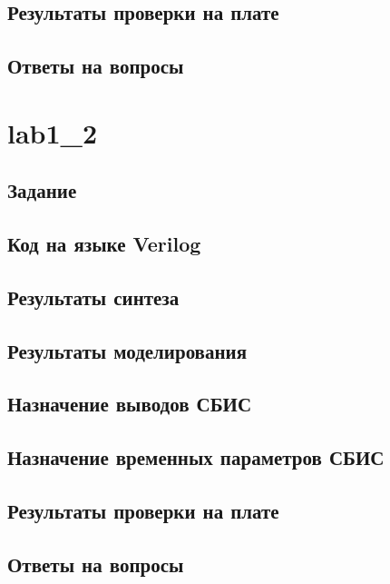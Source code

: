 \subsection{Результаты проверки на плате}

\subsection{Ответы на вопросы}

\section{lab1\_2}

\subsection{Задание}

\subsection{Код на языке Verilog}



\subsection{Результаты синтеза}

\subsection{Результаты моделирования}

\subsection{Назначение выводов СБИС}

\subsection{Назначение временных параметров СБИС}

\subsection{Результаты проверки на плате}

\subsection{Ответы на вопросы}

